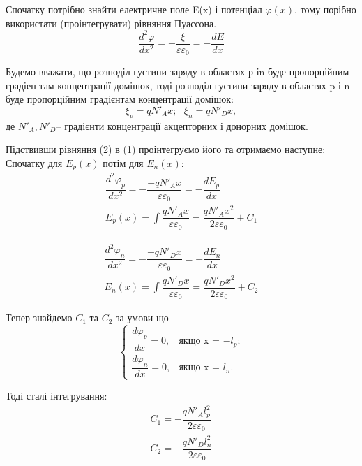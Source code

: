 \documentclass[14pt,a4paper]{scrartcl}
\begin{document}
\vspace{1cm}
Спочатку потрібно знайти електричне поле E(x) і потенціал $\varphi(x)$, тому порібно використати (проінтегрувати) рівняння Пуассона. 
\begin{equation}
\dfrac{d^2\varphi}{dx^2}=-\dfrac{\xi}{\varepsilon\varepsilon_0}=-\dfrac{dE}{dx}
\label{eq:ref}
\end{equation}


Будемо вважати, що розподіл густини заряду в областях р іn буде пропорційним градіен там концентрації домішок, тоді розподіл густини заряду в областях p і n буде пропорційним градієнтам концентрації домішок:
\begin{equation}
\xi_p=qN'_Ax;\text{ }\xi_n=qN'_Dx,
\label{eq:ref}
\end{equation}
де $N'_A, N'_D$-- градієнти концентрації акцепторних і донорних домішок.


Підствивши рівняння (2) в (1) проінтегруємо його та отримаємо наступне:\\

Спочатку для $E_p(x)$ потім для $E_n(x)$:
\begin{align}
\dfrac{d^2\varphi_p}{dx^2}=-\dfrac{-qN'_Ax}{\varepsilon\varepsilon_0}=-\dfrac{dE_p}{dx}\\
E_p(x) = \int \dfrac{qN'_Ax}{\varepsilon\varepsilon_0}=\dfrac{qN'_Ax^2}{2\varepsilon\varepsilon_0}+C_1
\end{align}

\begin{align}
\dfrac{d^2\varphi_n}{dx^2}=-\dfrac{-qN'_Dx}{\varepsilon\varepsilon_0}=-\dfrac{dE_n}{dx}\\
E_n(x) = \int \dfrac{qN'_Dx}{\varepsilon\varepsilon_0}=\dfrac{qN'_Dx^2}{2\varepsilon\varepsilon_0}+C_2
\end{align}


Тепер знайдемо $C_1$ та $C_2$ за умови що
\begin{equation*}
\begin{cases}
\dfrac{d\varphi_p}{dx}=0, & \text{якщо x = $-l_p$;} \\
\dfrac{d\varphi_n}{dx}=0, & \text{якщо x = $l_n$.} 
\end{cases}
\end{equation*}

Тоді сталі інтегрування:
\begin{align}
C_1=-\dfrac{qN'_Al_p^2}{2\varepsilon\varepsilon_0} \\
C_2 =-\dfrac{qN'_Dl_n^2}{2\varepsilon\varepsilon_0}
\end{align}
\end{document}
